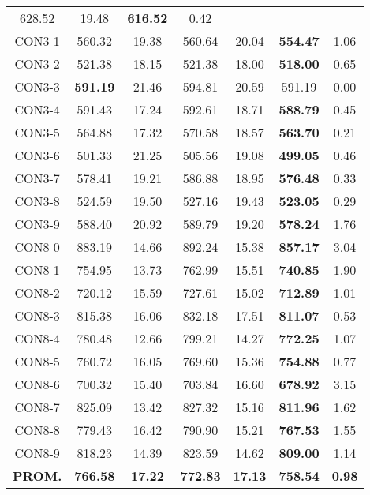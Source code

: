 \begin{table}[ht]
\begin{tabular}{c c c c c c c}
628.52 & 19.48 & \bf{616.52} & 
0.42\\CON3-1 & 560.32 & 19.38 & 
560.64 & 20.04 & \bf{554.47} & 
1.06\\CON3-2 & 521.38 & 18.15 & 
521.38 & 18.00 & \bf{518.00} & 
0.65\\CON3-3 & \bf{591.19} & 21.46 & 
594.81 & 20.59 & 591.19 & 0.00\\
CON3-4 & 591.43 & 17.24 & 
592.61 & 18.71 & \bf{588.79} & 
0.45\\CON3-5 & 564.88 & 17.32 & 
570.58 & 18.57 & \bf{563.70} & 
0.21\\CON3-6 & 501.33 & 21.25 & 
505.56 & 19.08 & \bf{499.05} & 
0.46\\CON3-7 & 578.41 & 19.21 & 
586.88 & 18.95 & \bf{576.48} & 
0.33\\CON3-8 & 524.59 & 19.50 & 
527.16 & 19.43 & \bf{523.05} & 
0.29\\CON3-9 & 588.40 & 20.92 & 
589.79 & 19.20 & \bf{578.24} & 
1.76\\CON8-0 & 883.19 & 14.66 & 
892.24 & 15.38 & \bf{857.17} & 
3.04\\CON8-1 & 754.95 & 13.73 & 
762.99 & 15.51 & \bf{740.85} & 
1.90\\CON8-2 & 720.12 & 15.59 & 
727.61 & 15.02 & \bf{712.89} & 
1.01\\CON8-3 & 815.38 & 16.06 & 
832.18 & 17.51 & \bf{811.07} & 
0.53\\CON8-4 & 780.48 & 12.66 & 
799.21 & 14.27 & \bf{772.25} & 
1.07\\CON8-5 & 760.72 & 16.05 & 
769.60 & 15.36 & \bf{754.88} & 
0.77\\CON8-6 & 700.32 & 15.40 & 
703.84 & 16.60 & \bf{678.92} & 
3.15\\CON8-7 & 825.09 & 13.42 & 
827.32 & 15.16 & \bf{811.96} & 
1.62\\CON8-8 & 779.43 & 16.42 & 
790.90 & 15.21 & \bf{767.53} & 
1.55\\CON8-9 & 818.23 & 14.39 & 
823.59 & 14.62 & \bf{809.00} & 
1.14\\\bf{PROM.} & 
\bf{766.58} & \bf{17.22} & \bf{772.83} & \bf{17.13} & \bf{758.54} & \bf{0.98}\\[1ex]\hline
\end{tabular}
\label{table:nonlin}
\end{table} \clearpage
